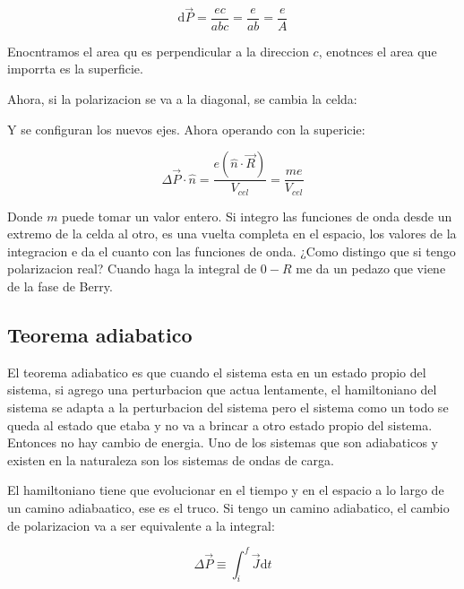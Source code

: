 \documentclass[11pt,fleqn]{book}
\begin{document}
\begin{equation}
    \mathrm{d}\vec{P}=\frac{ec}{abc}=\frac{e}{ab}=\frac{e}{A}
\end{equation}

Enocntramos el area qu es perpendicular a la direccion $c$, enotnces el area que imporrta es la superficie.


Ahora, si la polarizacion se va a la diagonal, se cambia la celda:


Y se configuran los nuevos ejes. Ahora operando con la supericie:

\begin{equation}
    \Delta\vec{P}\cdot\hat{n}=\frac{e(\hat{n}\cdot\vec{R})}{V_{cel}}=\frac{me}{V_{cel}}
\end{equation}

Donde $m$ puede tomar un valor entero. Si integro las funciones de onda desde un extremo de la celda al otro, es una vuelta completa en el espacio, los valores de la integracion e da el cuanto con las funciones de onda. ¿Como distingo que si tengo polarizacion real? Cuando haga la integral de $0-R$ me da un pedazo que viene de la fase de Berry.



\subsection{Teorema adiabatico}

El teorema adiabatico es que cuando el sistema esta en un estado propio del sistema, si agrego una perturbacion que actua lentamente, el hamiltoniano del sistema se adapta a la perturbacion del sistema pero el sistema como un todo se queda al estado que etaba y no va a brincar a otro estado propio del sistema. Entonces no hay cambio de energia. Uno de los sistemas que son adiabaticos y existen en la naturaleza son los sistemas de ondas de carga.

El hamiltoniano tiene que evolucionar en el tiempo y en el espacio a lo largo de un camino adiabaatico, ese es el truco. Si tengo un camino adiabatico, el cambio de polarizacion va a ser equivalente a la integral:

\begin{equation}
    \Delta\vec{P}\equiv\int_{i}^{f}\vec{J}\mathrm{d}t
\end{equation}
\end{document}

